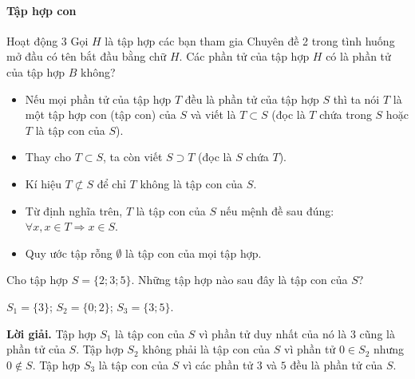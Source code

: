 \begin{kienthuc}
	\paragraph{Tập hợp con}
	\begin{hoatdong}{Hoạt động 3}
		Gọi $H$ là tập hợp các bạn tham gia Chuyên đề 2 trong tình huống mở đầu có tên bắt đầu bằng chữ $H$. Các phần tử của tập hợp $H$ có là phần tử của tập hợp $B$ không?
	\end{hoatdong}
	\begin{itemize}
		\item Nếu mọi phần tử của tập hợp $T$ đều là phần tử của tập hợp $S$ thì ta nói $T$ là một tập hợp con (tập con) của $S$ và viết là $T \subset S$ (đọc là $T$ chứa trong $S$ hoặc $T$ là tập con của $S$).
		\item Thay cho $T \subset S$, ta còn viết $S \supset T$ (đọc là $S$ chứa $T$).
		\item Kí hiệu $T \not\subset S$ để chỉ $T$ không là tập con của $S$.
		\item Từ định nghĩa trên, $T$ là tập con của $S$ nếu mệnh đề sau đúng: $\forall x, x \in T \Rightarrow x \in S$.
		\item Quy ước tập rỗng $\emptyset$ là tập con của mọi tập hợp.
	\end{itemize}
	\begin{vd}
		Cho tập hợp $S = \{2; 3; 5\}$. Những tập hợp nào sau đây là tập con của $S$?
		\begin{center}
			$S_1 = \{3\}$; $S_2 = \{0; 2\}$; $S_3 = \{3; 5\}$.
		\end{center}
		\textbf{Lời giải.}
		Tập hợp $S_1$ là tập con của $S$ vì phần tử duy nhất của nó là $3$ cũng là phần tử của $S$. Tập hợp $S_2$ không phải là tập con của $S$ vì phần tử $0 \in S_2$ nhưng $0 \notin S$. Tập hợp $S_3$ là tập con của $S$ vì các phần tử $3$ và $5$ đều là phần tử của $S$.
	\end{vd}


\end{kienthuc}
